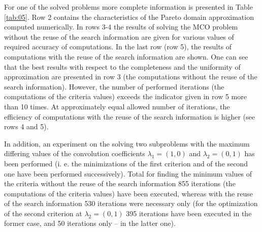 \documentclass[smallcondensed]{svjour3}     %
\begin{document}
For one of the solved problems more complete information is presented in Table \ref{tab:05}. Row 2 contains the characteristics of the Pareto domain approximation computed numerically. In rows 3-4 the results of solving the MCO problem without the reuse of the search information are given for various values of required accuracy of computations. In the last row (row 5), the results of computations with the reuse of the search information are shown. One can see that the best results with respect to the completeness and the uniformity of approximation are presented in row 3 (the computations without the reuse of the search information). However, the number of performed iterations (the computations of the criteria values) exceeds the indicator given in row 5 more than 10 times. At approximately equal allowed number of iterations, the efficiency of computations with the reuse of the search information is higher (see rows 4 and 5). \par

In addition, an experiment on the solving two subproblems with the maximum differing values of the convolution coefficients $\lambda_1=(1,0)$ and $\lambda_2=(0,1)$ has been performed (i. e. the minimizations of the first criterion and of the second one have been performed successively). Total for finding the minimum values of the criteria without the reuse of the search information 855 iterations (the computations of the criteria values) have been executed, whereas with the reuse of the search information 530 iterations were necessary only (for the optimization of the second criterion at $\lambda_2=(0,1)$ 395 iterations have been executed in the former case, and 50 iterations only – in the latter one).\par
\end{document}
